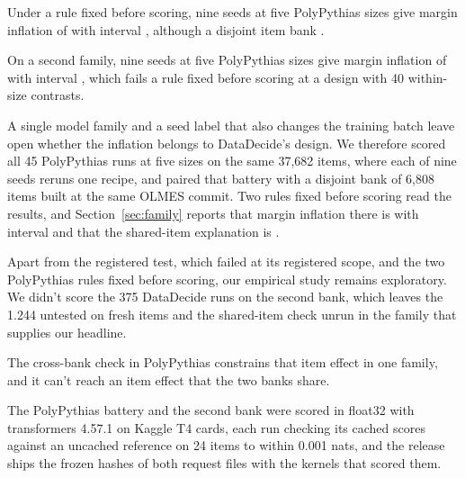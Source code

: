 Under a rule fixed before scoring, nine seeds at five PolyPythias sizes give margin inflation of  with interval , although a disjoint item bank .

On a second family, nine seeds at five PolyPythias sizes give margin inflation of  with interval , which fails a rule fixed before scoring at a design with 40 within-size contrasts.


A single model family and a seed label that also changes the training batch leave open whether the inflation belongs to DataDecide's design. We therefore scored all 45 PolyPythias runs at five sizes on the same 37,682 items, where each of nine seeds reruns one recipe, and paired that battery with a disjoint bank of 6,808 items built at the same OLMES commit. Two rules fixed before scoring read the results, and Section~\ref{sec:family} reports that margin inflation there is  with interval  and that the shared-item explanation is .


Apart from the registered test, which failed at its registered scope, and the two PolyPythias rules fixed before scoring, our empirical study remains exploratory. We didn't score the 375 DataDecide runs on the second bank, which leaves the 1.244 untested on fresh items and the shared-item check unrun in the family that supplies our headline.

The cross-bank check in PolyPythias constrains that item effect in one family, and it can't reach an item effect that the two banks share.


The PolyPythias battery and the second bank were scored in float32 with transformers 4.57.1 on Kaggle T4 cards, each run checking its cached scores against an uncached reference on 24 items to within 0.001 nats, and the release ships the frozen hashes of both request files with the kernels that scored them.
